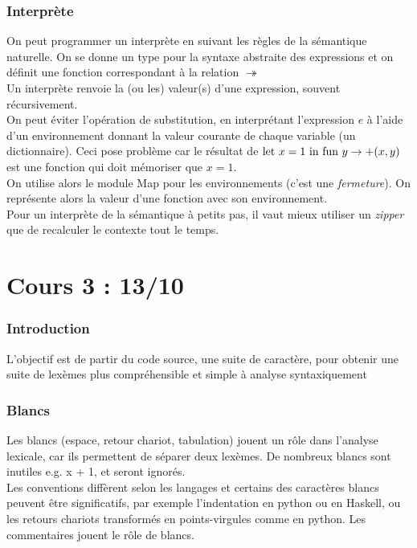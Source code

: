\documentclass{cours}
\begin{document}
\section{Interprète}
    On peut programmer un interprète en suivant les règles de la sémantique naturelle. On se donne un type pour la syntaxe abstraite des expressions et on définit une fonction correspondant à la relation $\twoheadrightarrow$\\
    Un interprète renvoie la (ou les) valeur(s) d'une expression, souvent récursivement.\\
    On peut éviter l'opération de substitution, en interprétant l'expression $e$ à l'aide d'un environnement donnant la valeur courante de chaque variable (un dictionnaire). Ceci pose problème car le résultat de $\textmd{let } x = 1 \textmd{ in fun } y \rightarrow +(x, y)$ est une fonction qui doit \og mémoriser \fg que $x = 1$.\\
    On utilise alors le module \textmd{Map} pour les environnements (c'est une \textit{fermeture}). On représente alors la valeur d'une fonction avec son environnement. \\
    Pour un interprète de la sémantique à petits pas, il vaut mieux utiliser un \textit{zipper} que de recalculer le contexte tout le temps. 

\part[Analyse Lexicale]{Cours 3 : 13/10}
\localtableofcontents
\section*{Introduction}
L'objectif est de partir du code source, une suite de caractère, pour obtenir une suite de lexèmes plus compréhensible et simple à analyse syntaxiquement

\section{Blancs}
Les blancs (espace, retour chariot, tabulation) jouent un rôle dans l'analyse lexicale, car ils permettent de séparer deux lexèmes. De nombreux blancs sont inutiles e.g. \textmd{x + 1}, et seront ignorés.\\
Les conventions diffèrent selon les langages et certains des caractères blancs peuvent être significatifs, par exemple l'indentation en python ou en Haskell, ou les retours chariots transformés en points-virgules comme en python. Les commentaires jouent le rôle de blancs.
\end{document}
